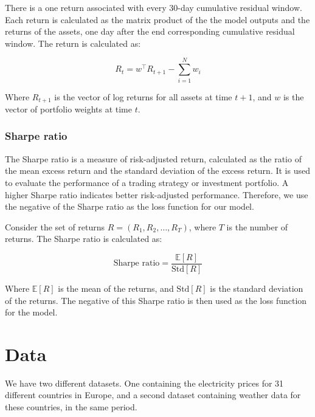 \documentclass[12pt]{article}
\begin{document}
There is a one return associated with every 30-day cumulative residual window. Each return is calculated as the matrix product of the the model outputs and the returns of the assets, one day after the end corresponding cumulative residual window. The return is calculated as:

\begin{equation}
    R_t = w^\top R_{t+1} - \sum_{i=1}^{N} w_i
    \label{eq:returns}
\end{equation}

Where $R_{t+1}$ is the vector of log returns for all assets at time $t+1$, and $w$ is the vector of portfolio weights at time $t$. 

\subsubsection*{Sharpe ratio}

The Sharpe ratio is a measure of risk-adjusted return, calculated as the ratio of the mean excess return and the standard deviation of the excess return. It is used to evaluate the performance of a trading strategy or investment portfolio. A higher Sharpe ratio indicates better risk-adjusted performance. Therefore, we use the negative of the Sharpe ratio as the loss function for our model. 

Consider the set of returns $R = (R_1, R_2, \ldots, R_T)$, where $T$ is the number of returns. The Sharpe ratio is calculated as:

\begin{equation}
    \text{Sharpe ratio} = \frac{\mathbb{E}[R]}{\text{Std}[R]}    
    \label{eq:sharpe_ratio}
\end{equation}

Where $\mathbb{E}[R]$ is the mean of the returns, and $\text{Std}[R]$ is the standard deviation of the returns. The negative of this Sharpe ratio is then used as the loss function for the model.

\clearpage






\section{Data}

We have two different datasets. One containing the electricity prices for 31 different countries in Europe, and a second dataset containing weather data for these countries, in the same period. 
\end{document}
